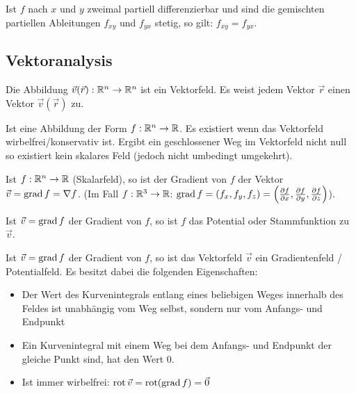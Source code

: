 \begin{satz}
Ist $f$ nach $x$ und $y$ zweimal partiell differenzierbar und sind die gemischten
partiellen Ableitungen $f_{xy}$ und $f_{yx}$ stetig, so gilt: $f_{xy} = f_{yx}$.
\end{satz}

\subsection{Vektoranalysis}
\begin{definition}[Vektorfeld]
Die Abbildung $\vec{v}(\vec{r}): \mathbb{R}^n \to \mathbb{R}^n$ ist ein Vektorfeld. Es weist jedem
Vektor $\vec{r}$ einen Vektor $\vec{v}(\vec{r})$ zu.
\end{definition}

\begin{definition}[Skalarfeld]
Ist eine Abbildung der Form $f: \mathbb{R}^n \to \mathbb{R}$. Es existiert wenn das Vektorfeld wirbelfrei/konservativ ist. Ergibt ein geschlossener Weg im Vektorfeld nicht null so existiert kein skalares Feld (jedoch nicht umbedingt umgekehrt).
\end{definition}

\begin{definition}[Gradient]
Ist $f: \mathbb{R}^n \to \mathbb{R}$ (Skalarfeld), so ist der Gradient von $f$ der Vektor
$\vec{v} = \operatorname{grad} f = \nabla f$. (Im Fall $f: \mathbb{R}^3 \to \mathbb{R}$:   $\operatorname{grad} f = (f_x, f_y, f_z) =
\left( \frac{\partial f}{\partial x}, \frac{\partial f}{\partial y}, \frac{\partial f}{\partial z} \right)$).
\end{definition}

\begin{definition}[Potential]
Ist $\vec{v} = \operatorname{grad} f$ der Gradient von $f$, so ist $f$ das Potential oder Stammfunktion zu $\vec{v}$.
\end{definition}

\begin{definition}
Ist $\vec{v} = \operatorname{grad} f$ der Gradient von $f$, so ist das Vektorfeld $\vec{v}$
ein Gradientenfeld / Potentialfeld. Es besitzt dabei die folgenden
Eigenschaften:
\begin{itemize}
	\item Der Wert des Kurvenintegrals entlang eines beliebigen Weges innerhalb des
	Feldes ist unabhängig vom Weg selbst, sondern nur vom Anfangs- und Endpunkt
	\item Ein Kurvenintegral mit einem Weg bei dem Anfangs- und Endpunkt der
	gleiche Punkt sind, hat den Wert 0.
	\item Ist immer wirbelfrei: $\operatorname{rot} \vec{v} = \operatorname{rot}(\operatorname{grad} f) = \vec{0}$
\end{itemize}
\end{definition}

